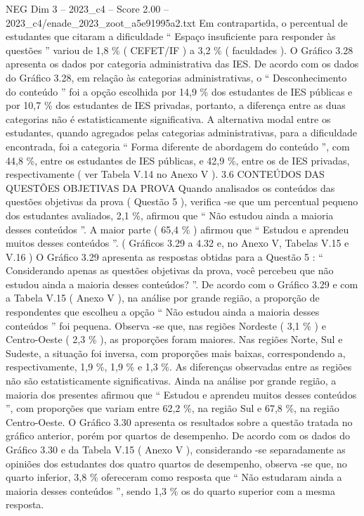 \begin{textsample}{NEG Dim 3 – 2023\_c4 – Score 2.00 – 2023\_c4/enade\_2023\_zoot\_a5e91995a2.txt}
Em contrapartida, o percentual de estudantes que citaram a dificuldade “ Espaço insuficiente para responder às questões ” variou de 1,8 \% ( CEFET/IF ) a 3,2 \% ( faculdades ).
O Gráfico 3.28 apresenta os dados por categoria administrativa das IES.
De acordo com os dados do Gráfico 3.28, em relação às categorias administrativas, o “ Desconhecimento do conteúdo ” foi a opção escolhida por 14,9 \% dos estudantes de IES públicas e por 10,7 \% dos estudantes de IES privadas, portanto, a diferença entre as duas categorias não é estatisticamente significativa.
A alternativa modal entre os estudantes, quando agregados pelas categorias administrativas, para a dificuldade encontrada, foi a categoria “ Forma diferente de abordagem do conteúdo ”, com 44,8 \%, entre os estudantes de IES públicas, e 42,9 \%, entre os de IES privadas, respectivamente ( ver Tabela V.14 no Anexo V ). 3.6 CONTEÚDOS DAS QUESTÕES OBJETIVAS DA PROVA Quando analisados os conteúdos das questões objetivas da prova ( Questão 5 ), verifica -se que um percentual pequeno dos estudantes avaliados, 2,1 \%, afirmou que “ Não estudou ainda a maioria desses conteúdos ”.
A maior parte ( 65,4 \% ) afirmou que “ Estudou e aprendeu muitos desses conteúdos ”. ( Gráficos 3.29 a 4.32 e, no Anexo V, Tabelas V.15 e V.16 ) O Gráfico 3.29 apresenta as respostas obtidas para a Questão 5 : “ Considerando apenas as questões objetivas da prova, você percebeu que não estudou ainda a maioria desses conteúdos? ”.
De acordo com o Gráfico 3.29 e com a Tabela V.15 ( Anexo V ), na análise por grande região, a proporção de respondentes que escolheu a opção “ Não estudou ainda a maioria desses conteúdos ” foi pequena.
Observa -se que, nas regiões Nordeste ( 3,1 \% ) e Centro-Oeste ( 2,3 \% ), as proporções foram maiores.
Nas regiões Norte, Sul e Sudeste, a situação foi inversa, com proporções mais baixas, correspondendo a, respectivamente, 1,9 \%, 1,9 \% e 1,3 \%.
As diferenças observadas entre as regiões não são estatisticamente significativas.
Ainda na análise por grande região, a maioria dos presentes afirmou que “ Estudou e aprendeu muitos desses conteúdos ”, com proporções que variam entre 62,2 \%, na região Sul e 67,8 \%, na região Centro-Oeste.
O Gráfico 3.30 apresenta os resultados sobre a questão tratada no gráfico anterior, porém por quartos de desempenho.
De acordo com os dados do Gráfico 3.30 e da Tabela V.15 ( Anexo V ), considerando -se separadamente as opiniões dos estudantes dos quatro quartos de desempenho, observa -se que, no quarto inferior, 3,8 \% ofereceram como resposta que “ Não estudaram ainda a maioria desses conteúdos ”, sendo 1,3 \% os do quarto superior com a mesma resposta.

\end{textsample}
